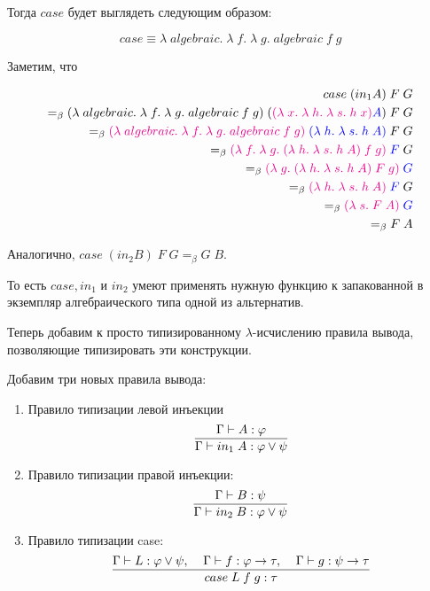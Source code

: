 Тогда $case$ будет выглядеть следующим образом:

$$case \equiv \lambda \; algebraic. \; \lambda \; f. \; \lambda \; g. \; algebraic \; f \; g$$

Заметим, что 

\begin{align*}
case \; (in_1 A) \; F \; G \\ =_\beta (\lambda \; algebraic. \; \lambda \; f. \; \lambda \; g. \; algebraic \; f \; g) \; (\textcolor{magenta}{(\lambda \; x. \; \lambda \; h. \; \lambda \; s. \; h \; x)} \textcolor{blue}{A}) \; F \; G \\ =_\beta  \textcolor{magenta}{(\lambda \; algebraic. \; \lambda \; f. \; \lambda \; g. \; algebraic \; f \; g)} \; \textcolor{blue}{(\lambda \; h. \; \lambda \; s. \; h \; A)} \; F \; G \\ =_\beta \textcolor{magenta}{(\lambda \; f. \; \lambda \; g. \; (\lambda \; h. \; \lambda \; s. \; h \; A) \; f \; g)} \; \textcolor{blue}{F} \; G \\ =_\beta \textcolor{magenta}{(\lambda \; g. \; (\lambda \; h. \; \lambda \; s. \; h \; A) \; F \; g)} \; \textcolor{blue}{G}  \\ =_\beta \textcolor{magenta}{(\lambda \; h. \; \lambda \; s. \; h \; A)} \; \textcolor{blue}{F} \; G \\ =_\beta \textcolor{magenta}{(\lambda \; s. \; F \; A)} \; \textcolor{blue}{G} \\ =_\beta F \; A
\end{align*}

Аналогично, $case \; (in_2 B) \; F \; G =_\beta G \; B$. 

То есть $case, in_1$ и $in_2$ умеют применять нужную функцию к запакованной в экземпляр алгебраического типа одной из альтернатив.

Теперь добавим к просто типизированному $\lambda$-исчислению правила вывода, позволяющие типизировать эти конструкции.

Добавим три новых правила вывода:

\begin{enumerate}
	\item Правило типизации левой инъекции
	\[
	\infer{\Gamma \vdash in_1 \; A: \varphi \vee \psi}{\Gamma\vdash A: \varphi}
	\]
	\item Правило типизации правой инъекции:
	\[
	\infer{\Gamma \vdash in_2 \; B: \varphi \vee \psi}{\Gamma\vdash B: \psi}
	\]
	
	\item Правило типизации case:
	\[
	\infer{case \; L \; f \; g : \tau}{\Gamma \vdash L: \varphi \vee \psi, \;\;\;\; \Gamma \vdash f : \varphi \to \tau, \;\;\;\; \Gamma \vdash g: \psi \to \tau}
	\]
\end{enumerate}

